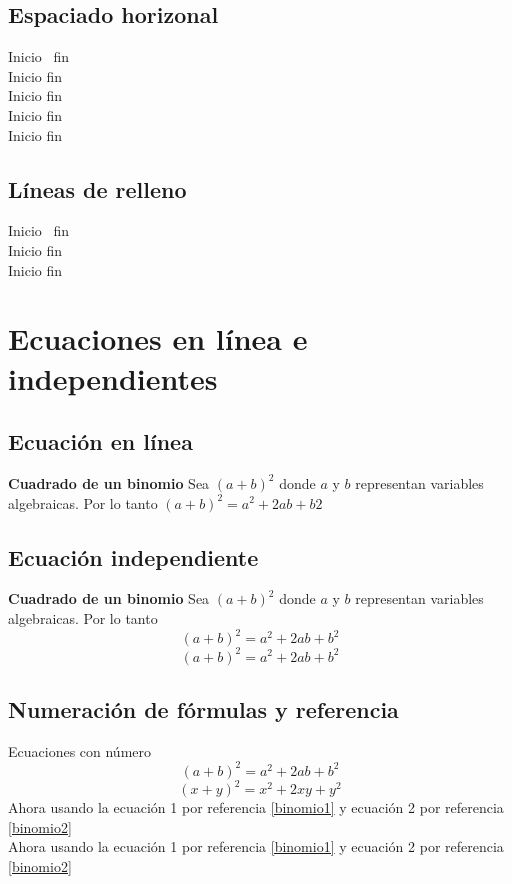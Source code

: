 \documentclass[12pt]{article}
\begin{document}
\subsection{Espaciado horizonal}
\noindent Inicio \, fin\\[0.2cm]
\noindent Inicio \quad fin\\[0.2cm]
\noindent Inicio \qquad fin\\[0.2cm]
\noindent Inicio \hspace{3cm} fin\\[0.2cm]
\noindent Inicio \hfill fin\\[0.2cm]

\subsection{Líneas de relleno}
\noindent Inicio \, fin\\[0.5cm]
Inicio \hrulefill fin\\[0.2cm]
Inicio \dotfill fin\\[0.2cm]


\section{Ecuaciones en línea e independientes}

\subsection{Ecuación en línea}
\textbf{Cuadrado de un binomio} Sea $(a+b)^2$ donde $a$ y $b$ representan variables algebraicas. Por lo tanto $(a+b)^2=a^{2}+2ab+b{2}$

\subsection{Ecuación independiente}
\textbf{Cuadrado de un binomio} Sea $(a+b)^2$ donde $a$ y $b$ representan variables algebraicas. Por lo tanto 
\[ (a+b)^2=a^{2}+2ab+b^{2} \]
\begin{equation*}
	(a+b)^2=a^{2}+2ab+b^{2}
\end{equation*}
\subsection{Numeración de fórmulas y referencia}
Ecuaciones con número
\begin{equation}\label{binomio1}
	(a+b)^2=a^{2}+2ab+b^{2}
\end{equation}
\begin{equation}\label{binomio2}
	(x+y)^2=x^{2}+2xy+y^{2}
\end{equation}
Ahora usando la ecuación 1 por referencia \ref{binomio1} y ecuación 2 por referencia \ref{binomio2} \\
Ahora usando la ecuación 1 por referencia \eqref{binomio1} y ecuación 2 por referencia \eqref{binomio2}
\end{document}
